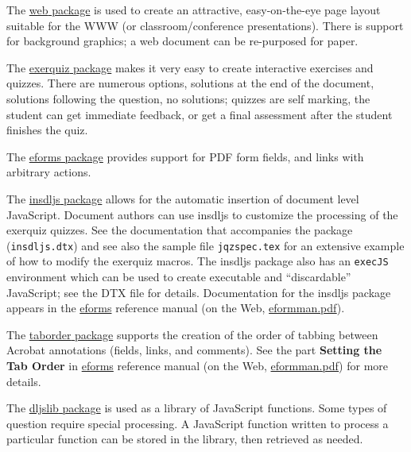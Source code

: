 \documentclass{article}
\def\Web{\textsf{web}}
\def\bUrl{http://www.math.uakron.edu/~dpstory}
\let\pkg\textsf
\begin{document}
\begin{questions}

\item The \hyperref[s:web]{\pkg{web} package} is used to create an
    attractive, easy-on-the-eye page layout suitable for the \textsf{WWW}
    (or classroom/conference presentations). There is support for
    background graphics; a {\Web} document can be re-purposed for
    paper.
\item  The \hyperref[s:exerquiz]{\pkg{exerquiz} package} makes
    it very easy to create interactive exercises and quizzes. There are
    numerous options, solutions at the end of the document, solutions
    following the question, no solutions; quizzes are self marking, the
    student can get immediate feedback, or get a final assessment after
    the student finishes the quiz.
\item The \href{eformman.pdf#eformsPkg}{\pkg{eforms} package} provides support for
    PDF form fields, and links with arbitrary actions.
\item The \href{eformman.pdf#insdljsPkg}{\pkg{insdljs} package} allows for the automatic
    insertion of document level JavaScript. Document authors can use
    \textsf{insdljs} to customize the processing of the
    \textsf{exerquiz} quizzes.  See the documentation that accompanies
    the package (\texttt{insdljs.dtx}) and see also the sample file
    \texttt{jqzspec.tex} for an extensive example of how to modify the
    \textsf{exerquiz} macros. The \textsf{insdljs} package also has an
    \texttt{execJS} environment which can be used to create executable
    and ``discardable'' JavaScript; see the DTX file for
    details.
    Documentation for the \pkg{insdljs} package appears in the
    \href{eformman.pdf#insdljsPkg}{\pkg{eforms}} reference manual
    (on the Web, \href{\bUrl/eformman.pdf#insdljsPkg}{eformman.pdf}).
\item The \href{eformman.pdf#taborderPkg}{\pkg{taborder} package} supports the creation of the order
    of tabbing between Acrobat annotations (fields, links, and comments).
    See the part \textbf{Setting the Tab Order} in \href{eformman.pdf#taborderPkg}{eforms}
    reference manual (on the Web, \href{\bUrl/eformman.pdf#taborderPkg}{eformman.pdf}) for more details.
\item The \hyperref[part:dljslib]{\pkg{dljslib} package} is used as a library of
    JavaScript functions.  Some types of question require special
    processing. A JavaScript function written to process a
    particular function can be stored in the library, then
    retrieved as needed.


\end{questions}
\end{document}
